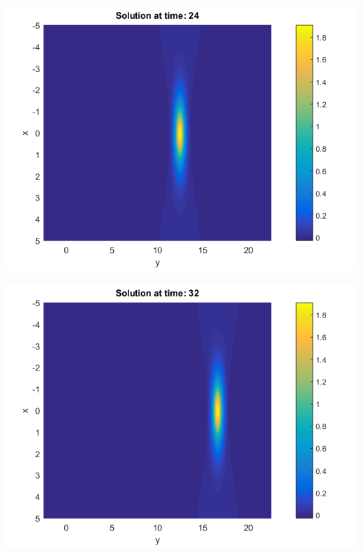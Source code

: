 \documentclass[a0,portrait]{a0poster}
\begin{document}
\begin{multicols}{2}
\begin{center}
	\begin{minipage}[b]{0.30\linewidth}
		\includegraphics[width=\linewidth]{figures/Solution_bt3_t=24.png}
	\end{minipage}	
	\begin{minipage}[b]{0.30\linewidth}
		 \includegraphics[width=\linewidth]{figures/Solution_bt3_t=32.png}
	\end{minipage}
	\begin{minipage}[b]{0.30\linewidth}

\end{minipage}
\end{center}
\end{multicols}
\end{document}
